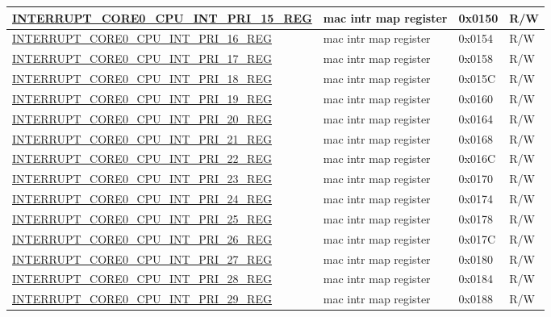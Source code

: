 \begin{longtable}{ | p{6cm} | p{7.2cm} | p{1.3cm} | p{1cm} | }
\hyperref[regdesc:INTERRUPTCORE0CPUINTPRI15REG]{INTERRUPT\_CORE0\_CPU\_INT\_PRI\_15\_REG} & mac intr map register & 0x0150 & R/W \\ \hline
\hyperref[regdesc:INTERRUPTCORE0CPUINTPRI16REG]{INTERRUPT\_CORE0\_CPU\_INT\_PRI\_16\_REG} & mac intr map register & 0x0154 & R/W \\ \hline
\hyperref[regdesc:INTERRUPTCORE0CPUINTPRI17REG]{INTERRUPT\_CORE0\_CPU\_INT\_PRI\_17\_REG} & mac intr map register & 0x0158 & R/W \\ \hline
\hyperref[regdesc:INTERRUPTCORE0CPUINTPRI18REG]{INTERRUPT\_CORE0\_CPU\_INT\_PRI\_18\_REG} & mac intr map register & 0x015C & R/W \\ \hline
\hyperref[regdesc:INTERRUPTCORE0CPUINTPRI19REG]{INTERRUPT\_CORE0\_CPU\_INT\_PRI\_19\_REG} & mac intr map register & 0x0160 & R/W \\ \hline
\hyperref[regdesc:INTERRUPTCORE0CPUINTPRI20REG]{INTERRUPT\_CORE0\_CPU\_INT\_PRI\_20\_REG} & mac intr map register & 0x0164 & R/W \\ \hline
\hyperref[regdesc:INTERRUPTCORE0CPUINTPRI21REG]{INTERRUPT\_CORE0\_CPU\_INT\_PRI\_21\_REG} & mac intr map register & 0x0168 & R/W \\ \hline
\hyperref[regdesc:INTERRUPTCORE0CPUINTPRI22REG]{INTERRUPT\_CORE0\_CPU\_INT\_PRI\_22\_REG} & mac intr map register & 0x016C & R/W \\ \hline
\hyperref[regdesc:INTERRUPTCORE0CPUINTPRI23REG]{INTERRUPT\_CORE0\_CPU\_INT\_PRI\_23\_REG} & mac intr map register & 0x0170 & R/W \\ \hline
\hyperref[regdesc:INTERRUPTCORE0CPUINTPRI24REG]{INTERRUPT\_CORE0\_CPU\_INT\_PRI\_24\_REG} & mac intr map register & 0x0174 & R/W \\ \hline
\hyperref[regdesc:INTERRUPTCORE0CPUINTPRI25REG]{INTERRUPT\_CORE0\_CPU\_INT\_PRI\_25\_REG} & mac intr map register & 0x0178 & R/W \\ \hline
\hyperref[regdesc:INTERRUPTCORE0CPUINTPRI26REG]{INTERRUPT\_CORE0\_CPU\_INT\_PRI\_26\_REG} & mac intr map register & 0x017C & R/W \\ \hline
\hyperref[regdesc:INTERRUPTCORE0CPUINTPRI27REG]{INTERRUPT\_CORE0\_CPU\_INT\_PRI\_27\_REG} & mac intr map register & 0x0180 & R/W \\ \hline
\hyperref[regdesc:INTERRUPTCORE0CPUINTPRI28REG]{INTERRUPT\_CORE0\_CPU\_INT\_PRI\_28\_REG} & mac intr map register & 0x0184 & R/W \\ \hline
\hyperref[regdesc:INTERRUPTCORE0CPUINTPRI29REG]{INTERRUPT\_CORE0\_CPU\_INT\_PRI\_29\_REG} & mac intr map register & 0x0188 & R/W \\ \hline

\end{longtable}
